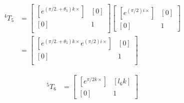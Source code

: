 \begin{solutionbox}[Q2-1]
    \begin{align*}
        {\,^4T_5} & =
        \begin{bmatrix}
            [e^{(\pi/2. +\theta_5) k \times}] & [0] \\
            [0]                               & 1   \\
        \end{bmatrix}
        \begin{bmatrix}
            [e^{(\pi/2) i \times}] & [0] \\
            [0]                    & 1
        \end{bmatrix} \\
                  & =
        \begin{bmatrix}
            [e^{(\pi/2. +\theta_5) k \times}e^{(\pi/2) i \times}] & [0] \\
            [0]                                                   & 1   \\
        \end{bmatrix}
    \end{align*}

    \begin{align*}
        {\,^5T_6} & =
        \begin{bmatrix}
            [e^{\pi/2 k \times}] & [l_6 k] \\
            [0]                  & 1
        \end{bmatrix}
    \end{align*}
\end{solutionbox}

